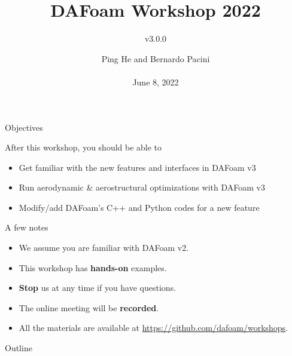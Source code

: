\documentclass{bredelebeamer}
\title[ ]{DAFoam Workshop 2022}
\subtitle{v3.0.0}
\author{Ping He and Bernardo Pacini \\ ~ \\June 8, 2022 }
\date[June 8, 2022]{}
\begin{document}
\begin{frame}
  \titlepage
\end{frame}



\begin{frame}{Objectives}

After this workshop, you should be able to
\begin{itemize}
  \setlength\itemsep{1em}
 \item Get familiar with the new features and interfaces in DAFoam v3
 \item Run aerodynamic \& aerostructural optimizations with DAFoam v3
 \item Modify/add DAFoam's C++ and Python codes for a new feature
\end{itemize}

\end{frame}

\begin{frame}{A few notes}

  \begin{itemize}
    \setlength\itemsep{1em}
   \item We assume you are familiar with DAFoam v2.
   \item This workshop has \textbf{hands-on} examples.
   \item \textbf{Stop} us at any time if you have questions.
   \item The online meeting will be \textbf{recorded}.
   \item All the materials are available at \url{https://github.com/dafoam/workshops}.
\end{itemize}
  
\end{frame}

\begin{frame}{Outline}
  \tableofcontents
\end{frame}

\end{document}
